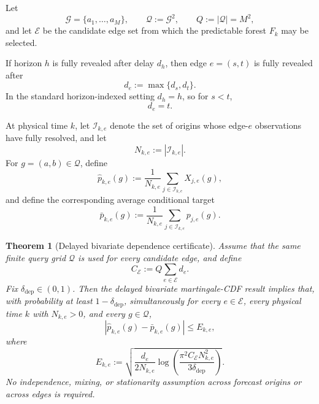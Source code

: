 \documentclass[11pt]{article}
\newtheorem{theorem}{Theorem}
\begin{document}
Let
\[
    \mathcal G=\{a_1,\ldots,a_M\},
    \qquad
    \mathcal Q:=\mathcal G^2,
    \qquad
    Q:=|\mathcal Q|=M^2,
\]
and let $\mathcal E$ be the candidate edge set from which the predictable
forest $F_k$ may be selected.

If horizon $h$ is fully revealed after delay $d_h$, then edge $e=(s,t)$ is
fully revealed after
\begin{equation}
    d_e
    :=
    \max\{d_s,d_t\}.
    \label{eq:edge-delay}
\end{equation}
In the standard horizon-indexed setting $d_h=h$, so for $s<t$,
\[
    d_e=t.
\]

At physical time $k$, let $\mathcal I_{k,e}$ denote the set of origins whose
edge-$e$ observations have fully resolved, and let
\[
    N_{k,e}
    :=
    |\mathcal I_{k,e}|.
\]
For $g=(a,b)\in\mathcal Q$, define
\[
    \widehat p_{k,e}(g)
    :=
    \frac1{N_{k,e}}
    \sum_{j\in\mathcal I_{k,e}}
    X_{j,e}(g),
\]
and define the corresponding average conditional target
\[
    \bar p_{k,e}(g)
    :=
    \frac1{N_{k,e}}
    \sum_{j\in\mathcal I_{k,e}}
    p_{j,e}(g).
\]

\begin{theorem}[Delayed bivariate dependence certificate]
\label{thm:pairwise-dependence-certificate}
Assume that the same finite query grid $\mathcal Q$ is used for every
candidate edge, and define
\begin{equation}
    C_{\mathcal E}
    :=
    Q\sum_{e\in\mathcal E}d_e.
    \label{eq:global-edge-complexity}
\end{equation}
Fix $\delta_{\mathrm{dep}}\in(0,1)$.  Then the delayed bivariate
martingale-CDF result implies that, with probability at least
$1-\delta_{\mathrm{dep}}$, simultaneously for every
$e\in\mathcal E$, every physical time $k$ with $N_{k,e}>0$, and every
$g\in\mathcal Q$,
\begin{equation}
\boxed{
    \left|
        \widehat p_{k,e}(g)
        -
        \bar p_{k,e}(g)
    \right|
    \le
    E_{k,e},
}
\label{eq:edge-global-cdf-band}
\end{equation}
where
\begin{equation}
\boxed{
    E_{k,e}
    :=
    \sqrt{
        \frac{d_e}{2N_{k,e}}
        \log\!\left(
            \frac{
                \pi^2 C_{\mathcal E}N_{k,e}^2
            }{
                3\delta_{\mathrm{dep}}
            }
        \right)
    }.
}
\label{eq:edge-global-cdf-radius}
\end{equation}
No independence, mixing, or stationarity assumption across forecast origins
or across edges is required.
\end{theorem}
\end{document}
